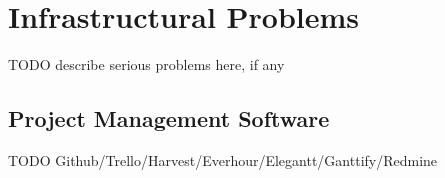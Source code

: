 \chapter{Infrastructural Problems}\label{ch:problems}
TODO describe serious problems here, if any

\section{Project Management Software}
TODO Github/Trello/Harvest/Everhour/Elegantt/Ganttify/Redmine\\
